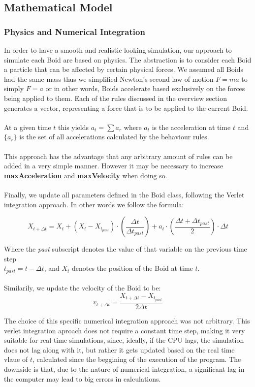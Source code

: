 \documentclass[12pt]{article}
\begin{document}
\subsection{Mathematical Model}
\subsubsection{Physics and Numerical Integration}
In order to have a smooth and realistic looking simulation, our approach to simulate each Boid are based on physics. The abstraction is to consider each Boid a particle that can be affected by certain physical forces. We assumed all Boids had the same mass thus we simplified Newton's second law of motion $F=ma$ to simply $F=a$ or in other words, Boids accelerate based exclusively on the forces being applied to them. Each of the rules discussed in the overview section generates a vector, representing a force that is to be applied to the current Boid. 
\\ \\
At a given time $t$ this yields $a_t = \sum a_r$ where $a_t$ is the acceleration at time $t$ and $\{a_r\}$ is the set of all accelerations calculated by the behaviour rules. 
\\ \\
This approach has the advantage that any arbitrary amount of rules can be added in a very simple manner. However it may be necessary to increase \textbf{maxAcceleration} and \textbf{maxVelocity}
when doing so.
\\ \\
Finally, we update all parameters defined in the Boid class, following the Verlet integration approach. In other words we follow the formula:

$$X_{t+\Delta t} = X_t + (X_t-X_{t_{past}})\cdot(\frac{\Delta t}{\Delta t_{past}}) + a_t\cdot(\frac{\Delta t + \Delta t_{past}}{2})\cdot\Delta t$$

Where the \textit{past} subscript denotes the value of that variable on the previous time step\\
$t_{past}=t-\Delta t$, and $X_t$ denotes the position of the Boid at time $t$.
\\ \\
Similarily, we update the velocity of the Boid to be: 
$$v_{t+\Delta t} = \frac{X_{t+\Delta t} - X_{t_{past}}}{2\Delta t}$$

The choice of this specific numerical integration approach was not arbitrary. This verlet integration aproach does not require a constant time step, making it very suitable for real-time simulations, since, ideally, if the CPU lags, the simulation does not lag along with it, but rather it gets updated based on the real time vlaue of $t$, calculated since the beggining of the execution of the program. The downside is that, due to the nature of numerical integration, a significant lag in the computer may lead to big errors in calculations.
\end{document}
